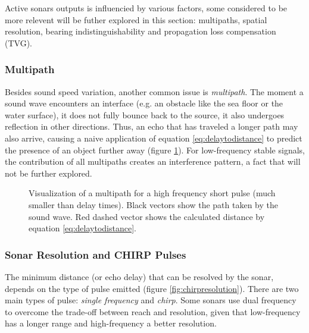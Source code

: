 Active sonars outputs is influencied by various factors, some considered to be
more relevent will be futher explored in this section: multipaths, spatial
resolution, bearing indistinguishability and propagation loss compensation
(TVG).



\subsubsection{Multipath}


Besides sound speed variation, another common issue is \textit{multipath}. The
moment a sound wave encounters an interface (e.g. an obstacle like the sea floor
or the water surface), it does not fully bounce back to the source, it also undergoes
reflection in other directions. Thus, an echo that has traveled a longer
path may also arrive, causing a naive application of equation \ref{eq:delaytodistance} to
predict the presence of an object further away (figure \ref{fig:multipath}). For
low-frequency stable signals, the contribution of all multipaths creates an
interference pattern\cite{LURTON}, a fact that will not be further explored. 

\begin{figure}
	\centering
	
	\caption{Visualization of a multipath for a high frequency short pulse (much
	smaller than delay times). Black vectors show the path taken by the sound
	wave. Red dashed vector shows the calculated distance by equation
	\ref{eq:delaytodistance}.}
	\label{fig:multipath}
\end{figure}

\subsubsection{Sonar Resolution and CHIRP Pulses}

The minimum distance (or echo delay) that can be resolved by the sonar, depends
on the type of pulse emitted (figure \ref{fig:chirpresolution}). There are two
main types of pulse:
\textit{single frequency} and \textit{chirp}\cite{chirp,gaussianchirp}. Some
sonars use dual frequency to overcome the trade-off between reach and
resolution, given that low-frequency has a longer range and high-frequency a better resolution.


